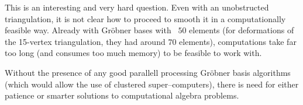 This is an interesting and very hard question. Even with an unobstructed triangulation, it is not clear how to proceed to smooth it in a computationally feasible way. Already with Gröbner bases with ~$50$ elements (for deformations of the 15-vertex triangulation, they had around $70$ elements), computations take far too long (and consumes too much memory) to be feasible to work with.

Without the presence of any good parallell processing Gröbner basis algorithms (which would allow the use of clustered super--computers), there is need for either patience or smarter solutions to computational algebra problems.